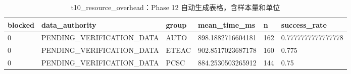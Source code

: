 \begin{table}[htbp]
\centering
\caption{t10_resource_overhead：Phase 12 自动生成表格，含样本量和单位}
\begin{tabular}{llllll}
\hline
blocked & data_authority & group & mean_time_ms & n & success_rate \\
\hline
0 & PENDING\_VERIFICATION\_DATA & AUTO & 898.1882716604181 & 162 & 0.7777777777777778 \\
0 & PENDING\_VERIFICATION\_DATA & ETEAC & 902.8517023687178 & 160 & 0.775 \\
0 & PENDING\_VERIFICATION\_DATA & PCSC & 884.2530503265912 & 144 & 0.75 \\
\hline
\end{tabular}
\end{table}
